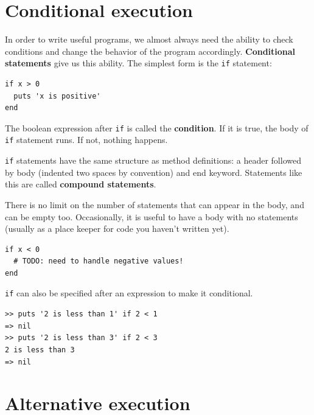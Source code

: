 \documentclass[10pt]{book}
\begin{document}
\section{Conditional execution}
\label{conditional.execution}

In order to write useful programs, we almost always need the ability
to check conditions and change the behavior of the program
accordingly.  {\bf Conditional statements} give us this ability.  The
simplest form is the {\tt if} statement:

\begin{verbatim}
if x > 0
  puts 'x is positive'
end
\end{verbatim}
%
The boolean expression after {\tt if} is
called the {\bf condition}.  If it is true, the body of {\tt if}
statement runs.  If not, nothing happens.

{\tt if} statements have the same structure as method definitions:
a header followed by body (indented two spaces by convention) and end keyword.
Statements like this are called {\bf compound statements}.

There is no limit on the number of statements that can appear in
the body, and can be empty too.
Occasionally, it is useful to have a body with no statements (usually
as a place keeper for code you haven't written yet).

\begin{verbatim}
if x < 0
  # TODO: need to handle negative values!
end
\end{verbatim}
%

{\tt if} can also be specified after an expression to make it conditional.

\begin{verbatim}
>> puts '2 is less than 1' if 2 < 1
=> nil
>> puts '2 is less than 3' if 2 < 3
2 is less than 3
=> nil
\end{verbatim}

\section{Alternative execution}
\label{alternative.execution}
\end{document}
